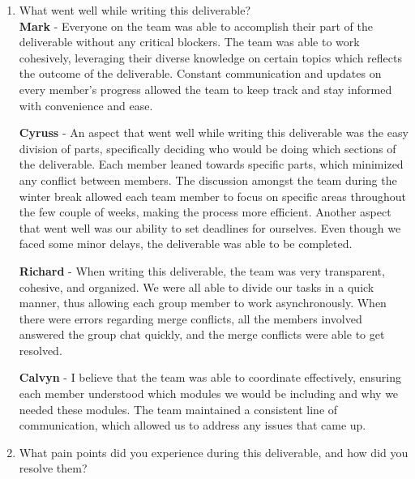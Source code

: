 \documentclass[12pt, titlepage]{article}
\begin{document}


% 

\begin{enumerate}
  \item What went well while writing this deliverable?\\
  

  \textbf{Mark} - Everyone on the team was able to accomplish their part of the deliverable without any critical blockers. The team was able to work cohesively, leveraging their diverse knowledge on certain topics which reflects the outcome of the deliverable. Constant communication and updates on every member’s progress allowed the team to keep track and stay informed with convenience and ease.

  \textbf{Cyruss} -  An aspect that went well while writing this deliverable was the easy division of parts, specifically deciding who would be doing which sections of the deliverable. Each member leaned towards specific parts, which minimized any conflict between members. The discussion amongst the team during the winter break allowed each team member to focus on specific areas throughout the few couple of weeks, making the process more efficient. Another aspect that went well was our ability to set deadlines for ourselves. Even though we faced some minor delays, the deliverable was able to be completed.
  
  \textbf{Richard} - When writing this deliverable, the team was very transparent, cohesive, and organized. We were all able to divide our tasks in a quick manner, thus allowing each group member to work asynchronously. When there were errors regarding merge conflicts, all the members involved answered the group chat quickly, and the merge conflicts were able to get resolved.
  
  
  \textbf{Calvyn} - I believe that the team was able to coordinate effectively, ensuring each member understood which modules we would be including and why we needed these modules. The team maintained a consistent line of communication, which allowed us to address any issues that came up.
  

  \item What pain points did you experience during this deliverable, and how
    did you resolve them?\\


\end{enumerate}
\end{document}
